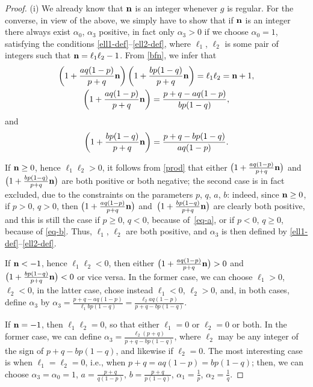 \documentclass[pdftex]{sigma}
\numberwithin{equation}{section}
\begin{document}
\begin{proof} (i) We already know that ${\bf n}$ is an integer whenever $g$ is regular. For the converse, in view of the above, we simply have to show that if ${\bf n}$ is an integer there always exist $\alpha _0$, $\alpha _3$ positive, in fact only $\alpha _3 > 0$ if we choose $\alpha _0 = 1$, satisfying the conditions \eqref{ell1-def}--\eqref{ell2-def}, where $\ell _1$, $\ell _2$ is some pair of integers such that ${\bf n} = \ell _1 \ell _2 - 1$. From \eqref{bfn}, we infer that
\begin{gather} \left(1 + \frac{a q (1 - p)}{p + q} {\bf n}\right) \left(1 + \frac{b p (1 - q)}{p + q} {\bf n}\right) = \ell _1 \ell _2 = {\bf n} + 1, \label{prod}\\
 \left(1 + \frac{a q (1 - p)}{p + q} {\bf n}\right) = \frac{p + q - a q (1 - p)}{b p (1 - q)}, \label{eq-a} \end{gather}
and
\begin{gather} \label{eq-b} \left(1 + \frac{b p (1 - q)}{p + q} {\bf n}\right) = \frac{p + q - b p (1 - q)}{a q (1 - p)}. \end{gather}


If ${\bf n} \geq 0$, hence $\ell _1 \ell _2 > 0$, it follows from \eqref{prod} that either $\big(1 + \frac{a q (1 - p)}{p + q} {\bf n}\big)$ and $\big(1 + \frac{b p (1 - q)}{p + q} {\bf n}\big)$ are both positive or both negative; the second case is in fact excluded, due to the constraints on the parameters $p$, $q$, $a$, $b$: indeed, since ${\bf n} \geq 0$, if $p >0$, $q >0$, then $\big(1 + \frac{a q (1 - p)}{p + q} {\bf n}\big)$ and~$\big(1 + \frac{b p (1 - q)}{p + q} {\bf n}\big)$ are clearly both positive, and this is still the case if $p \geq 0$, $q < 0$, because of~\eqref{eq-a}, or if $p < 0$, $q \geq 0$, because of \eqref{eq-b}. Thus, $\ell _1$, $\ell _2$ are both positive, and $\alpha _3$ is then defined by \eqref{ell1-def}--\eqref{ell2-def}.


If ${\bf n} < - 1$, hence $\ell _1 \ell _2 < 0$, then either $\big(1 + \frac{a q (1 - p)}{p + q} {\bf n}\big) > 0$ and $\big(1 + \frac{b p (1 - q)}{p + q} {\bf n}\big) < 0$ or vice versa. In the former case, we can choose $\ell _1 > 0$, $\ell _2 < 0$, in the latter case, chose instead $\ell _1 < 0$, $\ell _2 > 0$, and, in both cases, define $\alpha _3$ by $\alpha _3 = \frac{p + q - a q (1 - p)}{\ell _1 b p (1 - q)} = \frac{\ell _2 a q (1 - p)}{p + q - b p (1 - q)}$.


If ${\bf n} = - 1$, then $\ell _1 \ell _2 = 0$, so that either $\ell _1 = 0$ or $\ell _2 = 0$ or both. In the former case, we can define $\alpha _3 = \frac{\ell _2 (p + q)}{p + q - b p (1 - q)}$, where $\ell _2$ may be any integer of the sign of $p + q - b p (1 - q)$, and likewise if $\ell _2 = 0$. The most interesting case is when $\ell _1 = \ell _2 = 0$, i.e., when $p + q = a q (1 - p) = b p (1 - q)$; then, we can choose $\alpha _3 = \alpha _0 = 1$, $a = \frac{p + q}{q (1 - p)}$, $b = \frac{p + q}{p (1 - q)}$, $\alpha _1 = \frac{1}{p}$, $\alpha _2 = \frac{1}{q}$.


\end{proof}
\end{document}
